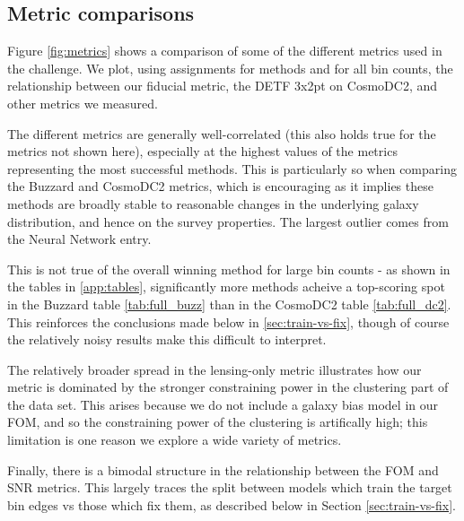 \documentclass[twocolumn,twocolappendix]{aastex63}
\begin{document}
\subsection{Metric comparisons} \label{sec:metric-results}
Figure \ref{fig:metrics} shows a comparison of some of the different metrics used in the challenge.
We plot, using assignments for methods and for all bin counts, the relationship between our fiducial
metric, the DETF 3x2pt on CosmoDC2, and other metrics we measured.

The different metrics are generally well-correlated (this also holds true for the metrics not 
shown here), especially at the highest values of the metrics representing the most successful
methods. This is particularly so when comparing the Buzzard and CosmoDC2 metrics, which is encouraging 
as it implies these methods are broadly stable to reasonable changes in the underlying galaxy
distribution, and hence on the survey properties.  The largest outlier comes from the 
{\sc Neural Network} entry.

This is not true of the overall winning method for large bin counts - as shown in the tables
in \autoref{app:tables}, significantly more methods acheive a top-scoring spot in the Buzzard
table \ref{tab:full_buzz} than in the CosmoDC2 table \ref{tab:full_dc2}. This reinforces the
conclusions made below in \autoref{sec:train-vs-fix}, though of course the relatively noisy
results make this difficult to interpret.

The relatively broader spread in the lensing-only metric illustrates how our metric is dominated
by the stronger constraining power in the clustering part of the data set.  This arises because
we do not include a galaxy bias model in our FOM, and so the constraining power of the clustering
is artifically high; this limitation is one reason we explore a wide variety of metrics.

Finally, there is a bimodal structure in the relationship between the FOM and SNR metrics.
This largely traces the split between models which train the target bin edges vs those
which fix them, as described below in Section \ref{sec:train-vs-fix}.
\end{document}

